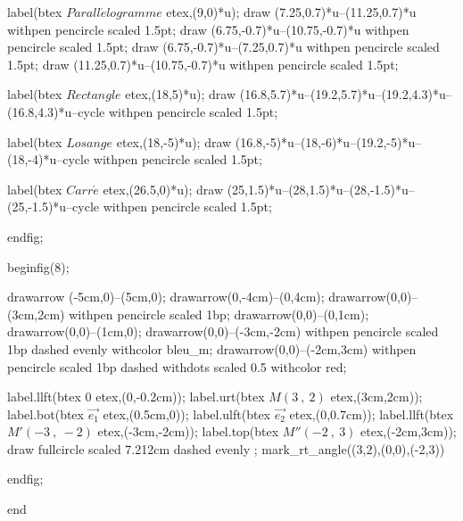 \documentclass[12pt]{article}
\begin{document}
label(btex $ Parall\acute{e}logramme $ etex,(9,0)*u);
draw (7.25,0.7)*u--(11.25,0.7)*u withpen pencircle scaled 1.5pt;
draw (6.75,-0.7)*u--(10.75,-0.7)*u withpen pencircle scaled 1.5pt;
draw (6.75,-0.7)*u--(7.25,0.7)*u withpen pencircle scaled 1.5pt;
draw (11.25,0.7)*u--(10.75,-0.7)*u withpen pencircle scaled 1.5pt;




label(btex $ Rectangle $ etex,(18,5)*u);
draw (16.8,5.7)*u--(19.2,5.7)*u--(19.2,4.3)*u--(16.8,4.3)*u--cycle withpen pencircle scaled 1.5pt;



label(btex $ Losange $ etex,(18,-5)*u);
draw (16.8,-5)*u--(18,-6)*u--(19.2,-5)*u--(18,-4)*u--cycle withpen pencircle scaled 1.5pt;



label(btex $ Carr\acute{e} $ etex,(26.5,0)*u);
draw (25,1.5)*u--(28,1.5)*u--(28,-1.5)*u--(25,-1.5)*u--cycle withpen pencircle scaled 1.5pt;






endfig;




beginfig(8);

drawarrow (-5cm,0)--(5cm,0);
drawarrow(0,-4cm)--(0,4cm);
drawarrow(0,0)--(3cm,2cm) withpen pencircle scaled 1bp;
drawarrow(0,0)--(0,1cm);
drawarrow(0,0)--(1cm,0);
drawarrow(0,0)--(-3cm,-2cm) withpen pencircle scaled 1bp dashed evenly  withcolor bleu_m;
drawarrow(0,0)--(-2cm,3cm) withpen pencircle scaled 1bp dashed withdots scaled 0.5 withcolor red;

%
%
label.llft(btex 0 etex,(0,-0.2cm));
label.urt(btex $M(3\ ,\ 2)$ etex,(3cm,2cm));
label.bot(btex $\overrightarrow{e_1}$ etex,(0.5cm,0));
label.ulft(btex $\overrightarrow{e_2}$ etex,(0,0.7cm));
label.llft(btex $M'(-3\ ,\ -2)$ etex,(-3cm,-2cm));
label.top(btex $M''(-2\ ,\ 3)$ etex,(-2cm,3cm));
draw fullcircle scaled 7.212cm dashed evenly ;
mark_rt_angle((3,2),(0,0),(-2,3))



endfig;




end
\end{document}
